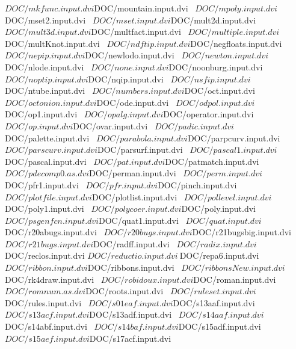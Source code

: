 \documentclass{article}
\begin{document}
  ${DOC}/mkfunc.input.dvi      ${DOC}/mountain.input.dvi   \
  ${DOC}/mpoly.input.dvi       ${DOC}/mset2.input.dvi      \
  ${DOC}/mset.input.dvi        ${DOC}/mult2d.input.dvi     \
  ${DOC}/mult3d.input.dvi      ${DOC}/multfact.input.dvi   \
  ${DOC}/multiple.input.dvi    ${DOC}/multKnot.input.dvi   \
  ${DOC}/ndftip.input.dvi      ${DOC}/negfloats.input.dvi  \
  ${DOC}/nepip.input.dvi       ${DOC}/newlodo.input.dvi    \
  ${DOC}/newton.input.dvi      ${DOC}/nlode.input.dvi      \
  ${DOC}/none.input.dvi        ${DOC}/noonburg.input.dvi   \
  ${DOC}/noptip.input.dvi      ${DOC}/nqip.input.dvi       \
  ${DOC}/nsfip.input.dvi       ${DOC}/ntube.input.dvi      \
  ${DOC}/numbers.input.dvi     ${DOC}/oct.input.dvi        \
  ${DOC}/octonion.input.dvi    ${DOC}/ode.input.dvi        \
  ${DOC}/odpol.input.dvi       ${DOC}/op1.input.dvi        \
  ${DOC}/opalg.input.dvi       ${DOC}/operator.input.dvi   \
  ${DOC}/op.input.dvi          ${DOC}/ovar.input.dvi       \
  ${DOC}/padic.input.dvi       ${DOC}/palette.input.dvi    \
  ${DOC}/parabola.input.dvi    ${DOC}/parpcurv.input.dvi   \
  ${DOC}/parscurv.input.dvi    ${DOC}/parsurf.input.dvi    \
  ${DOC}/pascal1.input.dvi     ${DOC}/pascal.input.dvi     \
  ${DOC}/pat.input.dvi         ${DOC}/patmatch.input.dvi   \
  ${DOC}/pdecomp0.as.dvi       ${DOC}/perman.input.dvi     \
  ${DOC}/perm.input.dvi        ${DOC}/pfr1.input.dvi       \
  ${DOC}/pfr.input.dvi         ${DOC}/pinch.input.dvi      \
  ${DOC}/plotfile.input.dvi    ${DOC}/plotlist.input.dvi   \
  ${DOC}/pollevel.input.dvi    ${DOC}/poly1.input.dvi      \
  ${DOC}/polycoer.input.dvi    ${DOC}/poly.input.dvi       \
  ${DOC}/psgenfcn.input.dvi    ${DOC}/quat1.input.dvi      \
  ${DOC}/quat.input.dvi        ${DOC}/r20abugs.input.dvi   \
  ${DOC}/r20bugs.input.dvi     ${DOC}/r21bugsbig.input.dvi \
  ${DOC}/r21bugs.input.dvi     ${DOC}/radff.input.dvi      \
  ${DOC}/radix.input.dvi      \
  ${DOC}/reclos.input.dvi      ${DOC}/reductio.input.dvi   \
  ${DOC}/repa6.input.dvi      \
  ${DOC}/ribbon.input.dvi      ${DOC}/ribbons.input.dvi    \
  ${DOC}/ribbonsNew.input.dvi  ${DOC}/rk4draw.input.dvi    \
  ${DOC}/robidoux.input.dvi    ${DOC}/roman.input.dvi      \
  ${DOC}/romnum.as.dvi         ${DOC}/roots.input.dvi      \
  ${DOC}/ruleset.input.dvi     ${DOC}/rules.input.dvi      \
  ${DOC}/s01eaf.input.dvi      ${DOC}/s13aaf.input.dvi     \
  ${DOC}/s13acf.input.dvi      ${DOC}/s13adf.input.dvi     \
  ${DOC}/s14aaf.input.dvi      ${DOC}/s14abf.input.dvi     \
  ${DOC}/s14baf.input.dvi      ${DOC}/s15adf.input.dvi     \
  ${DOC}/s15aef.input.dvi      ${DOC}/s17acf.input.dvi     \
\end{document}
